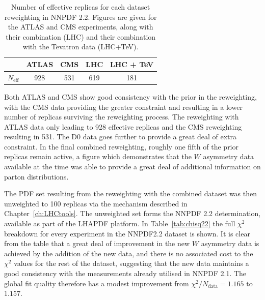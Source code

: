 \begin{table}[ht]
  \begin{center}
    \begin{tabular}{|c|c|c|c|c|}
      \hline
       & ATLAS & CMS & LHC & LHC + TeV\\
      \hline
      $N_{\text{eff}}$ & 928 & 531 & 619 & 181 \\
      \hline
    \end{tabular}
  \end{center}
  \caption[Number of effective replicas for each dataset reweighting in NNPDF 2.2]{Number of effective replicas for each dataset reweighting in NNPDF 2.2. Figures are given for the ATLAS and CMS experiments, along with their combination (LHC) and their combination with the Tevatron data (LHC+TeV).}
  \label{tab:22Neff}
\end{table}

Both ATLAS and CMS show good consistency with the prior in the reweighting, with the CMS data providing the greater constraint and resulting in a lower number of replicas surviving the reweighting process. The reweighting with ATLAS data only leading to 928 effective replicas and the CMS reweighting resulting in 531. The D0 data goes further to provide a great deal of extra constraint. In the final combined reweighting, roughly one fifth of the prior replicas remain active, a figure which demonstrates that the $W$ asymmetry data available at the time was able to provide a great deal of additional information on parton distributions.

The PDF set resulting from the reweighting with the combined dataset was then unweighted to 100 replicas via the mechanism described in Chapter~\ref{ch:LHCtools}. The unweighted set forms the NNPDF 2.2 determination, available as part of the LHAPDF platform. In Table~\ref{tab:chisq22} the full $\chi^2$ breakdown for every experiment
in the NNPDF2.2 dataset is shown. It is clear from the table that a great deal of improvement in the new $W$ asymmetry data is achieved by the addition of the new data, and there is no associated cost to the $\chi^2$ values for the rest of the dataset, suggesting that the new data maintains a good consistency with the measurements already utilised in NNPDF 2.1. The global fit quality therefore has a modest improvement from $\chi^2/N_{\text{data}}=1.165$ to $1.157$.

